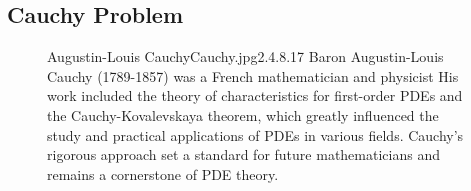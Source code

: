 \documentclass[]{article}
\begin{document}
\subsection{Cauchy Problem}
\begin{figure}[b]
    \begin{enrichment}{Augustin-Louis Cauchy}{Cauchy.jpg}{2.4}{.8}{.17}
        Baron Augustin-Louis Cauchy (1789-1857) was a French mathematician and physicist 
        His work included the theory of characteristics for first-order PDEs and the Cauchy-Kovalevskaya theorem, which greatly influenced the study and practical applications of PDEs in various fields. Cauchy's rigorous approach set a standard for future mathematicians and remains a cornerstone of PDE theory.
    \end{enrichment}    
\end{figure}
\end{document}
